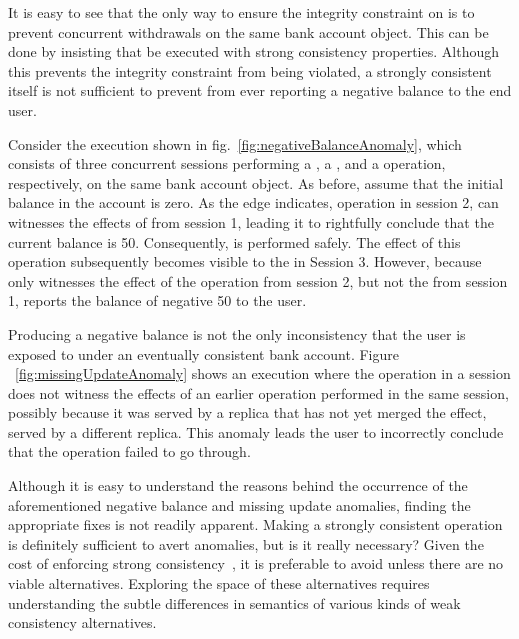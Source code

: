 It is easy to see that the only way to ensure the integrity constraint on
 is to prevent concurrent withdrawals on the same bank account
object. This can be done by insisting that  be executed with
strong consistency properties. Although this prevents the integrity
constraint from being violated, a strongly consistent  itself
is not sufficient to prevent  from ever reporting a negative
balance to the end user.

Consider the execution shown in fig.~\ref{fig:negativeBalanceAnomaly}, which
consists of three concurrent sessions performing a , a
, and a  operation, respectively, on the same
bank account object. As before, assume that the initial balance in the
account is zero. As the  edge indicates, operation 
in session 2, can witnesses the effects of  from session 1,
leading it to rightfully conclude that the current balance is
50. Consequently,  is performed safely. The effect of this
 operation subsequently becomes visible to the 
in Session 3.  However, because  only witnesses the effect of
the  operation from session 2, but not the  from
session 1, reports the balance of negative 50 to the user.

Producing a negative balance is not the only inconsistency that the user is
exposed to under an eventually consistent bank account. Figure
~\ref{fig:missingUpdateAnomaly} shows an execution where the 
operation in a session does not witness the effects of an earlier
 operation performed in the same session, possibly because it
was served by a replica that has not yet merged the  effect,
served by a different replica. This anomaly leads the user to incorrectly
conclude that the  operation failed to go through.



Although it is easy to understand the reasons behind the occurrence of the
aforementioned negative balance and missing update anomalies, finding the
appropriate fixes is not readily apparent. Making  a strongly
consistent operation is definitely sufficient to avert anomalies, but is it
really necessary? Given the cost of enforcing strong
consistency~\cite{DynamoDB, Pileus}, it is preferable to avoid unless there
are no viable alternatives.  Exploring the space of these alternatives
requires understanding the subtle differences in semantics of various kinds
of weak consistency alternatives.

